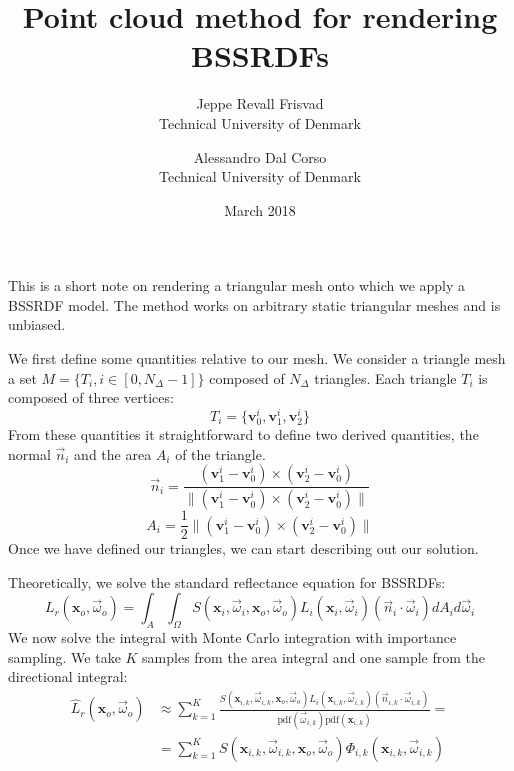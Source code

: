 \documentclass[10pt,a4paper]{article}
\title{Point cloud method for rendering BSSRDFs}
\date{March 2018}
\author{Jeppe Revall Frisvad \\ Technical University of Denmark
\and Alessandro Dal Corso \\ Technical University of Denmark}
\begin{document}
\maketitle

This is a short note on rendering a triangular mesh onto which we apply a BSSRDF model. The method works on arbitrary static triangular meshes and is unbiased.

We first define some quantities relative to our mesh. We consider a triangle mesh a set $M = \{T_i, i \in [0, N_\Delta - 1] \}$ composed of $N_{\Delta}$ triangles. Each triangle $T_i$ is composed of three vertices:
\begin{equation*}
T_i = \{ \mathbf{v}^i_0, \mathbf{v}^i_1, \mathbf{v}^i_2 \}
\end{equation*}
From these quantities it straightforward to define two derived quantities, the normal $\vec{n}_i$ and the area $A_i$ of the triangle. 
\begin{equation*}
\vec{n}_i = \frac{(\mathbf{v}^i_1 - \mathbf{v}^i_0) \times (\mathbf{v}^i_2 - \mathbf{v}^i_0) }{ \|(\mathbf{v}^i_1 - \mathbf{v}^i_0) \times (\mathbf{v}^i_2 - \mathbf{v}^i_0)  \|}
\end{equation*}
\begin{equation*}
A_i = \frac{1}{2} \|(\mathbf{v}^i_1 - \mathbf{v}^i_0) \times (\mathbf{v}^i_2 - \mathbf{v}^i_0) \|
\end{equation*}
Once we have defined our triangles, we can start describing out our solution. 

Theoretically, we solve the standard reflectance equation for BSSRDFs:
\begin{equation*}
L_r(\mathbf{x}_o, \vec{\omega}_o) = \int_A \int_\Omega S(\mathbf{x}_i, \vec{\omega}_i, \mathbf{x}_o, \vec{\omega}_o) L_i(\mathbf{x}_i, \vec{\omega}_i) (\vec{n}_i \cdot \vec{\omega}_i) d A_i d \vec{\omega}_i 
\end{equation*}
We now solve the integral with Monte Carlo integration with importance sampling. We take $K$ samples from the area integral and one sample from the directional integral:
\begin{equation}
\label{eq:mc}
\begin{split}
\hat{L}_r(\mathbf{x}_o, \vec{\omega}_o) &\approx \sum_{k = 1}^K \frac{S(\mathbf{x}_{i,k}, \vec{\omega}_{i,k}, \mathbf{x}_o, \vec{\omega}_o) L_i(\mathbf{x}_{i,k}, \vec{\omega}_{i,k}) (\vec{n}_{i,k}\cdot \vec{\omega}_{i,k})}{\text{pdf}(\vec{\omega}_{i,k}) \text{pdf}(\mathbf{x}_{i,k})} = \\
&=  \sum_{k = 1}^K S(\mathbf{x}_{i,k}, \vec{\omega}_{i,k}, \mathbf{x}_o, \vec{\omega}_o) \Phi_{i,k}(\mathbf{x}_{i,k}, \vec{\omega}_{i,k})
\end{split}
\end{equation}
\end{document}
